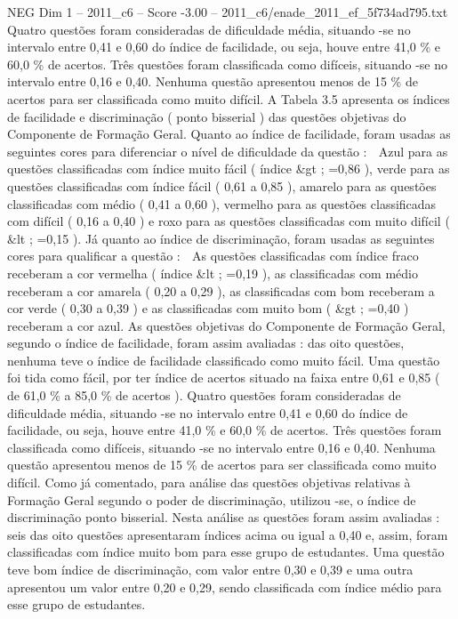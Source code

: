 \begin{textsample}{NEG Dim 1 – 2011\_c6 – Score -3.00 – 2011\_c6/enade\_2011\_ef\_5f734ad795.txt}
Quatro questões foram consideradas de dificuldade média, situando -se no intervalo entre 0,41 e 0,60 do índice de facilidade, ou seja, houve entre 41,0 \% e 60,0 \% de acertos.
Três questões foram classificada como difíceis, situando -se no intervalo entre 0,16 e 0,40.
Nenhuma questão apresentou menos de 15 \% de acertos para ser classificada como muito difícil.
A Tabela 3.5 apresenta os índices de facilidade e discriminação ( ponto bisserial ) das questões objetivas do Componente de Formação Geral.
Quanto ao índice de facilidade, foram usadas as seguintes cores para diferenciar o nível de dificuldade da questão :  Azul para as questões classificadas com índice muito fácil ( índice \&gt ; =0,86 ), verde para as questões classificadas com índice fácil ( 0,61 a 0,85 ), amarelo para as questões classificadas com médio ( 0,41 a 0,60 ), vermelho para as questões classificadas com difícil ( 0,16 a 0,40 ) e roxo para as questões classificadas com muito difícil ( \&lt ; =0,15 ).
Já quanto ao índice de discriminação, foram usadas as seguintes cores para qualificar a questão :  As questões classificadas com índice fraco receberam a cor vermelha ( índice \&lt ; =0,19 ), as classificadas com médio receberam a cor amarela ( 0,20 a 0,29 ), as classificadas com bom receberam a cor verde ( 0,30 a 0,39 ) e as classificadas com muito bom ( \&gt ; =0,40 ) receberam a cor azul.
As questões objetivas do Componente de Formação Geral, segundo o índice de facilidade, foram assim avaliadas : das oito questões, nenhuma teve o índice de facilidade classificado como muito fácil.
Uma questão foi tida como fácil, por ter índice de acertos situado na faixa entre 0,61 e 0,85 ( de 61,0 \% a 85,0 \% de acertos ).
Quatro questões foram consideradas de dificuldade média, situando -se no intervalo entre 0,41 e 0,60 do índice de facilidade, ou seja, houve entre 41,0 \% e 60,0 \% de acertos.
Três questões foram classificada como difíceis, situando -se no intervalo entre 0,16 e 0,40.
Nenhuma questão apresentou menos de 15 \% de acertos para ser classificada como muito difícil.
Como já comentado, para análise das questões objetivas relativas à Formação Geral segundo o poder de discriminação, utilizou -se, o índice de discriminação ponto bisserial.
Nesta análise as questões foram assim avaliadas : seis das oito questões apresentaram índices acima ou igual a 0,40 e, assim, foram classificadas com índice muito bom para esse grupo de estudantes.
Uma questão teve bom índice de discriminação, com valor entre 0,30 e 0,39 e uma outra apresentou um valor entre 0,20 e 0,29, sendo classificada com índice médio para esse grupo de estudantes.

\end{textsample}
